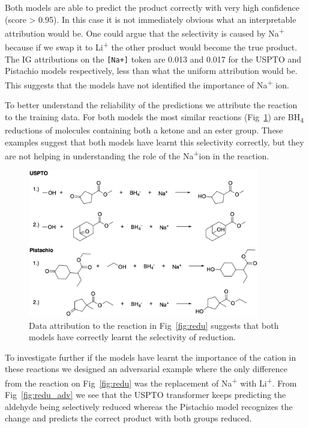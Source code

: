 Both models are able to predict the product correctly with very high confidence (score > 0.95). In this case it is not immediately obvious what an interpretable attribution would be. One could argue that the selectivity is caused by Na\textsuperscript{+} because if we swap it to Li\textsuperscript{+} the other product would become the true product. The IG attributions on the \texttt{[Na+]} token are 0.013 and 0.017 for the USPTO and Pistachio models respectively, less than what the uniform attribution would be. This suggests that the models have not identified the importance of Na\textsuperscript{+} ion. 

To better understand the reliability of the predictions we attribute the reaction to the training data. For both models the most similar reactions (Fig~\ref{fig:redu_dat}) are BH\textsubscript{4} reductions of molecules containing both a ketone and an ester group. These examples suggest that both models have learnt this selectivity correctly, but they are not helping in understanding the role of the Na\textsuperscript{+}ion in the reaction.

\begin{figure}[htbp!] 
\centering    
\includegraphics[width=0.9\textwidth]{Chapters/Ch4/Figs/reduction_dat.png}
\caption{Data attribution to the reaction in Fig~\ref{fig:redu} suggests that both models have correctly learnt the selectivity of reduction.}
\label{fig:redu_dat}
\end{figure}

To investigate further if the models have learnt the importance of the cation in these reactions we designed an adversarial example where the only difference from the reaction on Fig~\ref{fig:redu} was the replacement of Na\textsuperscript{+} with Li\textsuperscript{+}. From Fig~\ref{fig:redu_adv} we see that the USPTO transformer keeps predicting the aldehyde being selectively reduced whereas the Pistachio model recognizes the change and predicts the correct product with both groups reduced. 

